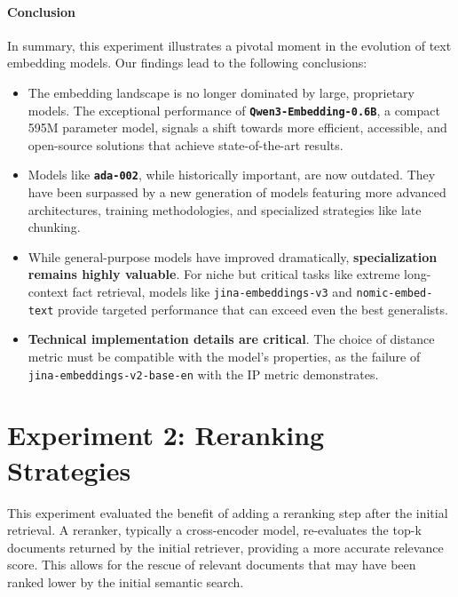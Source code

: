 \paragraph{Conclusion}
In summary, this experiment illustrates a pivotal moment in the evolution of text embedding models. Our findings lead to the following conclusions:
\begin{itemize}
    \item The embedding landscape is no longer dominated by large, proprietary models. The exceptional performance of \textbf{\texttt{Qwen3-Embedding-0.6B}}, a compact 595M parameter model, signals a shift towards more efficient, accessible, and open-source solutions that achieve state-of-the-art results.
    \item Models like \textbf{\texttt{ada-002}}, while historically important, are now outdated. They have been surpassed by a new generation of models featuring more advanced architectures, training methodologies, and specialized strategies like late chunking.
    \item While general-purpose models have improved dramatically, \textbf{specialization remains highly valuable}. For niche but critical tasks like extreme long-context fact retrieval, models like \texttt{jina-embeddings-v3} and \texttt{nomic-embed-text} provide targeted performance that can exceed even the best generalists.
    \item \textbf{Technical implementation details are critical}. The choice of distance metric must be compatible with the model's properties, as the failure of \texttt{jina-embeddings-v2-base-en} with the IP metric demonstrates.
\end{itemize}



\section{Experiment 2: Reranking Strategies}
\label{sec:exp_reranking}
This experiment evaluated the benefit of adding a reranking step after the initial retrieval. A reranker, typically a cross-encoder model, re-evaluates the top-k documents returned by the initial retriever, providing a more accurate relevance score. This allows for the rescue of relevant documents that may have been ranked lower by the initial semantic search.

